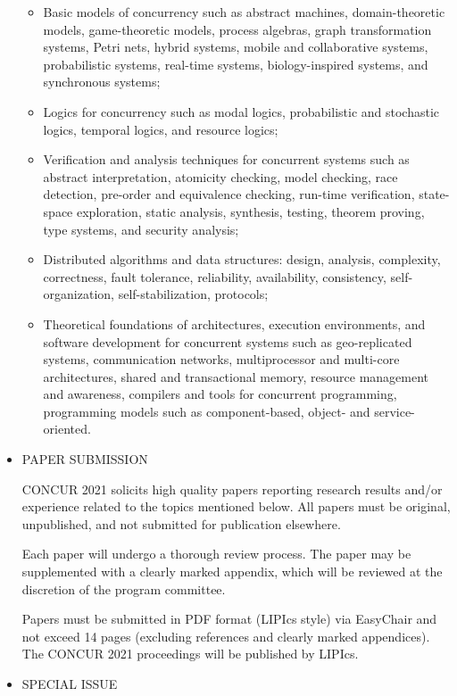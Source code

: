 \documentclass{article}
\begin{document}
\begin{itemize}
\begin{itemize}\item  Basic models of concurrency such as abstract machines, domain-theoretic models, game-theoretic models, process algebras, graph transformation systems, Petri nets, hybrid systems, mobile and collaborative systems, probabilistic systems, real-time systems, biology-inspired systems, and synchronous systems;
\item  Logics for concurrency such as modal logics, probabilistic and stochastic logics, temporal logics, and resource logics; 
\item  Verification and analysis techniques for concurrent systems such as abstract interpretation, atomicity checking, model checking, race detection, pre-order and equivalence checking, run-time verification, state-space exploration, static analysis, synthesis, testing, theorem proving, type systems, and security analysis;
\item  Distributed algorithms and data structures: design, analysis, complexity, correctness, fault tolerance, reliability, availability, consistency, self-organization, self-stabilization, protocols;
\item  Theoretical foundations of architectures, execution environments, and software development for concurrent systems such as geo-replicated systems, communication networks, multiprocessor and multi-core architectures, shared and transactional memory, resource management and awareness, compilers and tools for concurrent programming, programming models such as component-based, object- and service-oriented.
\end{itemize} 
\item  PAPER SUBMISSION 
 
  CONCUR 2021 solicits high quality papers reporting research results and/or experience related to the topics mentioned below. All papers must be original, unpublished, and not submitted for publication elsewhere. 
 
  Each paper will undergo a thorough review process. The paper may be supplemented with a clearly marked appendix, which will be reviewed at the discretion of the program committee.  
 
  Papers must be submitted in PDF format (LIPIcs style) via EasyChair and not exceed 14 pages (excluding references and clearly marked appendices). The CONCUR 2021 proceedings will be published by LIPIcs.  
 
\item  SPECIAL ISSUE 
 

\end{itemize}
\end{document}
